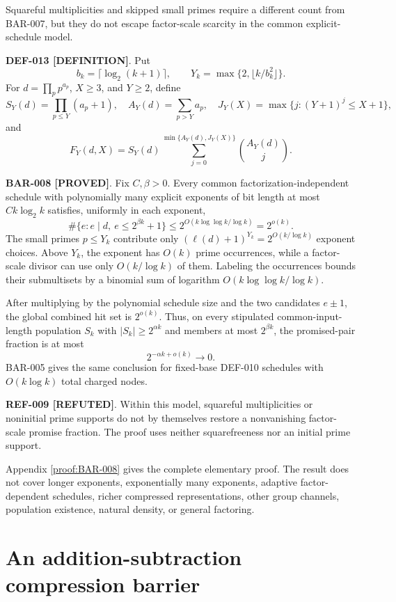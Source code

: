 \documentclass[11pt]{article}
\newcommand{\claimstatus}[2]{\textbf{#1 [#2]}}
\begin{document}
Squareful multiplicities and skipped small primes require a different count
from BAR-007, but they do not escape factor-scale scarcity in the common
explicit-schedule model.

\claimstatus{DEF-013}{DEFINITION}. Put
\[
b_k=\lceil\log_2(k+1)\rceil,\qquad
Y_k=\max\{2,\lfloor k/b_k^2\rfloor\}.
\]
For \(d=\prod_p p^{a_p}\), \(X\ge3\), and \(Y\ge2\), define
\[
S_Y(d)=\prod_{p\le Y}(a_p+1),\quad
A_Y(d)=\sum_{p>Y}a_p,\quad
J_Y(X)=\max\{j:(Y+1)^j\le X+1\},
\]
and
\[
F_Y(d,X)=S_Y(d)
\sum_{j=0}^{\min\{A_Y(d),J_Y(X)\}}\binom{A_Y(d)}j.
\]

\claimstatus{BAR-008}{PROVED}. Fix \(C,\beta>0\). Every common
factorization-independent schedule with polynomially many explicit exponents
of bit length at most \(Ck\log_2k\) satisfies, uniformly in each exponent,
\[
\#\{e:e\mid d,\ e\le2^{\beta k}+1\}
\le2^{O(k\log\log k/\log k)}
=2^{o(k)}.
\]
The small primes \(p\le Y_k\) contribute only
\((\ell(d)+1)^{Y_k}=2^{O(k/\log k)}\) exponent choices. Above \(Y_k\), the
exponent has \(O(k)\) prime occurrences, while a factor-scale divisor can use
only \(O(k/\log k)\) of them. Labeling the occurrences bounds their
submultisets by a binomial sum of logarithm
\(O(k\log\log k/\log k)\).

After multiplying by the polynomial schedule size and the two candidates
\(e\pm1\), the global combined hit set is \(2^{o(k)}\). Thus, on every
stipulated common-input-length population \(S_k\) with
\(|S_k|\ge2^{\alpha k}\) and members at most \(2^{\beta k}\), the
promised-pair fraction is at most
\[
2^{-\alpha k+o(k)}\longrightarrow0.
\]
BAR-005 gives the same conclusion for fixed-base DEF-010 schedules with
\(O(k\log k)\) total charged nodes.

\claimstatus{REF-009}{REFUTED}. Within this model, squareful multiplicities or
noninitial prime supports do not by themselves restore a nonvanishing
factor-scale promise fraction. The proof uses neither squarefreeness nor an
initial prime support.

Appendix \ref{proof:BAR-008} gives the complete elementary proof. The result
does not cover longer exponents, exponentially many exponents, adaptive
factor-dependent schedules, richer compressed representations, other group
channels, population existence, natural density, or general factoring.

\section{An addition-subtraction compression barrier}
\end{document}
